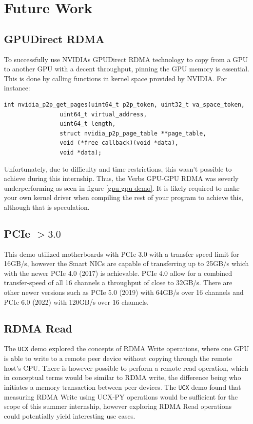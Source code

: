 \documentclass[a4paper,onecolumn]{article}
\begin{document}
\pagebreak
\section{Future Work}

\subsection{GPUDirect RDMA}
To successfully use NVIDIAs GPUDirect RDMA technology to copy from a GPU to another GPU with a decent throughput, pinning the GPU memory is essential. This is done by calling functions in kernel space provided by NVIDIA. For instance: \begin{verbatim}
int nvidia_p2p_get_pages(uint64_t p2p_token, uint32_t va_space_token,
                uint64_t virtual_address,
                uint64_t length,
                struct nvidia_p2p_page_table **page_table,
                void (*free_callback)(void *data),
                void *data);

\end{verbatim}
Unfortunately, due to difficulty and time restrictions, this wasn't possible to achieve during this internship. Thus, the Verbs GPU-GPU RDMA was severly underperforming as seen in figure \ref{gpu-gpu-demo}. It is likely required to make your own kernel driver when compiling the rest of your program to achieve this, although that is speculation.

\subsection{PCIe $>3.0$}
This demo utilized motherboards with PCIe 3.0 with a transfer speed limit for 16GB/s, however the Smart NICs are capable of transferring up to 25GB/s which with the newer PCIe 4.0 (2017) is achievable. PCIe 4.0 allow for a combined transfer-speed of all 16 channels a throughput of close to 32GB/s. There are other newer versions such as PCIe 5.0 (2019) with 64GB/s over 16 channels and PCIe 6.0 (2022) with 120GB/s over 16 channels. \cite{article_wikipedia_pcie}

\subsection{RDMA Read}
The \verb|UCX| demo explored the concepts of RDMA Write operations, where one GPU is able to write to a remote peer device without copying through the remote host's CPU. There is however possible to perform a remote read operation, which in conceptual terms would be similar to RDMA write, the difference being who initiates a memory transaction between peer devices. The \verb|UCX| demo found that measuring RDMA Write using UCX-PY operations would be sufficient for the scope of this summer internship, however exploring RDMA Read operations could potentially yield interesting use cases.
\end{document}
